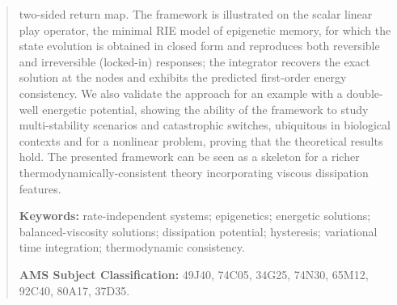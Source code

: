 \documentclass[11pt,a4paper]{article}
\theoremstyle{plain}
\theoremstyle{definition}
\begin{document}
\begin{abstract}
two-sided return map. The framework is illustrated on the scalar linear
play operator, the minimal RIE model of epigenetic memory, for which
the state evolution is obtained in closed form and reproduces both
reversible and irreversible (locked-in) responses; the integrator
recovers the exact solution at the nodes and exhibits the predicted
first-order energy consistency. We also validate the approach for an example with a double-well energetic potential, showing the ability of the framework to study multi-stability scenarios and catastrophic switches, ubiquitous in biological contexts and for a nonlinear problem, proving that the theoretical results hold. The presented framework can be seen as a skeleton for a richer thermodynamically-consistent theory incorporating viscous dissipation features.

\medskip
\noindent\textbf{Keywords:} rate-independent systems; epigenetics;
energetic solutions; balanced-viscosity solutions; dissipation
potential; hysteresis; variational time integration;
thermodynamic consistency.

\medskip
\noindent\textbf{AMS Subject Classification:}
49J40, 74C05, 34G25, 74N30, 65M12, 92C40, 80A17, 37D35.
\end{abstract}

\setcounter{tocdepth}{2}
\tableofcontents
\bigskip










\appendix




\end{document}
